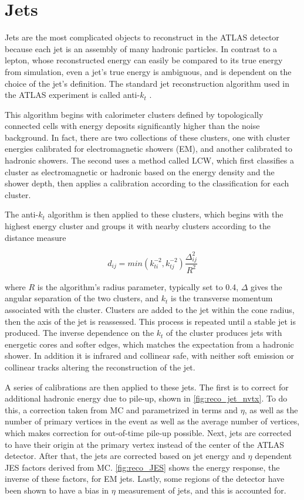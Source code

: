 \section{Jets}
\label{sec:reco_jets}

Jets are the most complicated objects to reconstruct in the ATLAS detector because each jet is an assembly of many hadronic particles. In contrast to a lepton, whose reconstructed energy can easily be compared to its true energy from simulation, even a jet's true energy is ambiguous, and is dependent on the choice of the jet's definition. The standard jet reconstruction algorithm used in the ATLAS experiment is called anti-$k_t$ \cite{Cacciari:2008gp}. 

This algorithm begins with calorimeter clusters defined by topologically connected cells with energy deposits significantly higher than the noise background. In fact, there are two collections of these clusters, one with cluster energies calibrated for electromagnetic showers (\acs{EM}), and another calibrated to hadronic showers. The second uses a method called \ac{LCW}, which first classifies a cluster as electromagnetic or hadronic based on the energy density and the shower depth, then applies a calibration according to the classification for each cluster.

The anti-$k_t$ algorithm is then applied to these clusters, which begins with the highest energy cluster and groups it with nearby clusters according to the distance measure

\begin{equation}
d_{ij} = min(k^{-2}_{ti}, k^{-2}_{tj}) \frac{\Delta_{ij}^2}{R^2}
\end{equation}

where $R$ is the algorithm's radius parameter, typically set to 0.4, $\Delta$ gives the angular separation of the two clusters, and $k_t$ is the transverse momentum associated with the cluster. Clusters are added to the jet within the cone radius, then the axis of the jet is reassessed. This process is repeated until a stable jet is produced. The inverse dependence on the $k_t$ of the cluster produces jets with energetic cores and softer edges, which matches the expectation from a hadronic shower. In addition it is infrared and collinear safe, with neither soft emission or collinear tracks altering the reconstruction of the jet. 

A series of calibrations are then applied to these jets. The first is to correct for additional hadronic energy due to pile-up, shown in \autoref{fig:reco_jet_nvtx}. To do this, a correction taken from \ac{MC} and parametrized in terms \pt and $\eta$, as well as the number of primary vertices in the event as well as the average number of vertices, which makes correction for out-of-time pile-up possible. Next, jets are corrected to have their origin at the primary vertex instead of the center of the ATLAS detector. After that, the jets are corrected based on jet energy and $\eta$ dependent \ac{JES} factors derived from \ac{MC}. \autoref{fig:reco_JES} shows the energy response, the inverse of these factors, for \ac{EM} jets. Lastly, some regions of the detector have been shown to have a bias in $\eta$ measurement of jets, and this is accounted for. 


